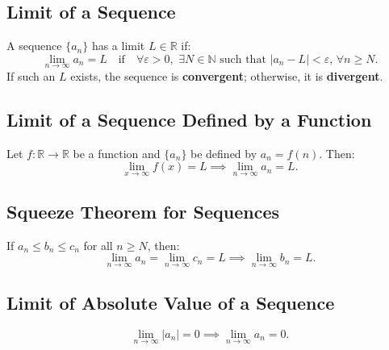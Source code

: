 \documentclass[a4paper,11pt]{article}
\theoremstyle{definition}
\theoremstyle{plain}
\theoremstyle{remark}
\begin{document}


\subsection{Limit of a Sequence}

\begin{tcolorbox}
    A sequence $\{a_n\}$ has a limit $L \in \mathbb{R}$ if:
    \[
    \lim_{n \to \infty} a_n = L \quad \text{if} \quad \forall \varepsilon>0, \, \, \exists N \in \mathbb{N} \text{ such that } |a_n - L| < \varepsilon, \, \forall n \geq N.
    \]
    If such an $L$ exists, the sequence is \textbf{convergent}; otherwise, it is \textbf{divergent}.
\end{tcolorbox}




\subsection{Limit of a Sequence Defined by a Function}

\begin{tcolorbox}
    Let $f: \mathbb{R} \to \mathbb{R}$ be a function and $\{a_n\}$ be defined by $a_n = f(n)$. Then:
    \[
    \lim_{x \to \infty} f(x) = L \implies \lim_{n \to \infty} a_n = L.
    \]
\end{tcolorbox}




\subsection{Squeeze Theorem for Sequences}

\begin{tcolorbox}
    If $a_n \leq b_n \leq c_n$ for all $n \geq N$, then:
    \[
    \lim_{n \to \infty} a_n = \lim_{n \to \infty} c_n = L \implies \lim_{n \to \infty} b_n = L.
    \]
\end{tcolorbox}




\subsection{Limit of Absolute Value of a Sequence}

\begin{tcolorbox}
    \[
    \lim_{n \to \infty} | a_n | = 0 \implies \lim_{n \to \infty} a_n = 0.
    \]
\end{tcolorbox}
\end{document}
